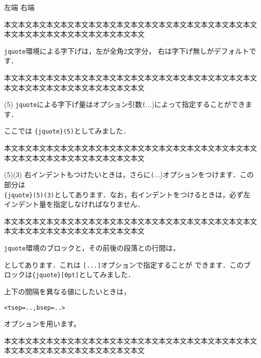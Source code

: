 \noindent
左端 \hfill 右端\par
本文本文本文本文本文本文本文本文本文本文本文本文本文本文本文本文本文本文本文本文本文本文本文本文本文本文本文本文
\begin{jquote}
\texttt{jquote}環境による字下げは，左が全角2文字分，
右は字下げ無しがデフォルトです．
\end{jquote}
本文本文本文本文本文本文本文本文本文本文本文本文本文本文本文本文本文本文本文本文本文本文本文本文本文本文本文本文
\begin{jquote}(5\zw)
\texttt{jquote}による字下げ量はオプション引数\texttt(...)によって指定することができます．\par
ここでは \texttt{\{jquote\}(5\zw)}としてみました．
\end{jquote}
本文本文本文本文本文本文本文本文本文本文本文本文本文本文本文本文本文本文本文本文本文本文本文本文本文本文本文本文
\begin{jquote}(5\zw)(3\zw)
右インデントもつけたいときは，さらに\texttt(...)オプションをつけます．この部分は\\\texttt{\{jquote\}(5\zw)(3\zw)}としてあります．なお，右インデントをつけるときは，必ず左インデント量を指定しなければなりません．
\end{jquote}
本文本文本文本文本文本文本文本文本文本文本文本文本文本文本文本文本文本文本文本文本文本文本文本文本文本文本文本文
\begin{jquote}[0pt]
\texttt{jquote}環境のブロックと，その前後の段落との行間は，
    \begin{jquote}
    \end{jquote}
としてあります．これは \texttt{[...]}オプションで指定することが
できます．このブロックは\texttt{\{jquote\}[0pt]}としてみました．
\the\topsep

上下の間隔を異なる値にしたいときは，
\begin{jquote}
\begin{verbatim}
<tsep=..,bsep=..>
\end{verbatim}
\end{jquote}
オプションを用います。
\end{jquote}
本文本文本文本文本文本文本文本文本文本文本文本文本文本文本文本文本文本文本文本文本文本文本文本文本文本文本文本文
